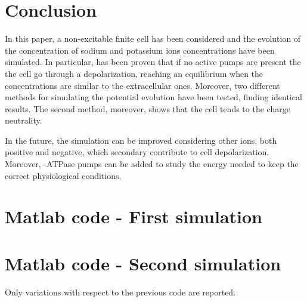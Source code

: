 \documentclass[11pt,a4 paper]{article}
\begin{document}
\section*{Conclusion}
In this paper, a non-excitable finite cell has been considered and the evolution of the concentration of sodium and potassium ions concentrations have been simulated. In particular, has been proven that if no active pumps are present the the cell go through a depolarization, reaching an equilibrium when the concentrations are similar to the extracellular ones. Moreover, two different methods for simulating the potential evolution have been tested, finding identical results. The second method, moreover, shows that the cell tends to the charge neutrality.

In the future, the simulation can be improved considering other ions, both positive and negative, which secondary contribute to cell depolarization. Moreover, -ATPase pumps can be added to study the energy needed to keep the correct physiological conditions.

\appendix
\section{Matlab code - First simulation}

    
\section{Matlab code - Second simulation}
Only variations with respect to the previous code are reported.

\end{document}
